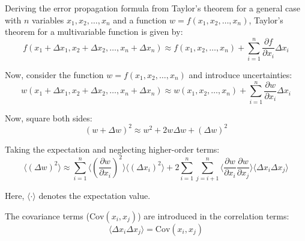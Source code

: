 \documentclass{article}
\begin{document}


Deriving the error propagation formula from Taylor's theorem for a general case with \( n \) variables \( x_1, x_2, \ldots, x_n \) and a function \( w = f(x_1, x_2, \ldots, x_n) \), Taylor's theorem for a multivariable function is given by\cite{taylor2022introduction}\cite{LUO201723}:
\begin{equation}
f(x_1 + \Delta x_1, x_2 + \Delta x_2, \ldots, x_n + \Delta x_n) \approx f(x_1, x_2, \ldots, x_n) + \sum_{i=1}^{n} \frac{\partial f}{\partial x_i} \Delta x_i
\end{equation}

Now, consider the function \( w = f(x_1, x_2, \ldots, x_n) \) and introduce uncertainties:
\begin{equation}
w(x_1 + \Delta x_1, x_2 + \Delta x_2, \ldots, x_n + \Delta x_n) \approx w(x_1, x_2, \ldots, x_n) + \sum_{i=1}^{n} \frac{\partial w}{\partial x_i} \Delta x_i
\end{equation}

Now, square both sides:
\begin{equation}
(w + \Delta w)^2 \approx w^2 + 2w\Delta w + (\Delta w)^2
\end{equation}

Taking the expectation and neglecting higher-order terms:
\begin{equation}
\langle (\Delta w)^2 \rangle \approx \sum_{i=1}^{n} \langle \left(\frac{\partial w}{\partial x_i}\right)^2 \rangle \langle (\Delta x_i)^2 \rangle + 2 \sum_{i=1}^{n} \sum_{j=i+1}^{n} \langle \frac{\partial w}{\partial x_i} \frac{\partial w}{\partial x_j} \rangle \langle \Delta x_i \Delta x_j \rangle
\end{equation}

Here, \( \langle \cdot \rangle \) denotes the expectation value.

The covariance terms (\( \text{Cov}(x_i, x_j) \)) are introduced in the correlation terms:
\begin{equation}
\langle \Delta x_i \Delta x_j \rangle = \text{Cov}(x_i, x_j)
\end{equation}
\end{document}

